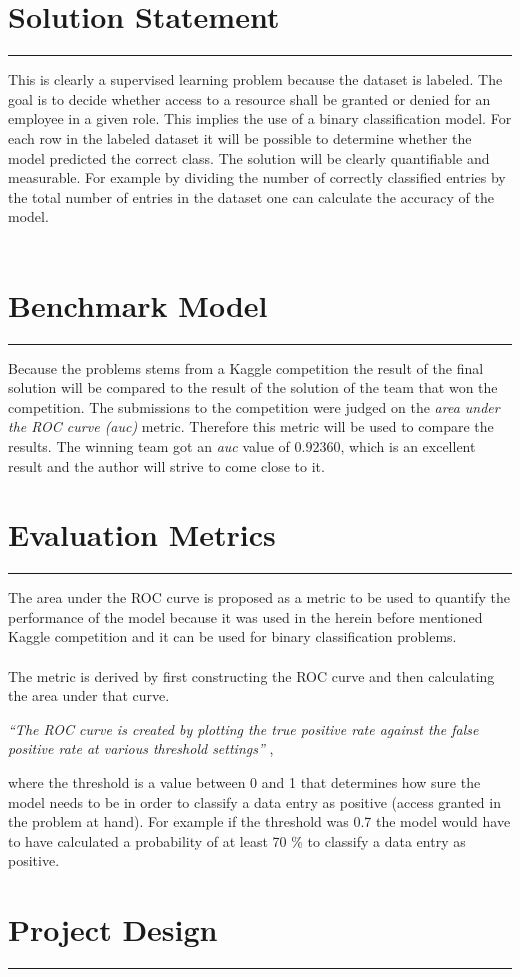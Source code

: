 \documentclass[11pt]{article}
\def\sectionheader#1{\section*{#1}\vskip -0.3cm\hrule\vskip 0.3cm}
\begin{document}
\sectionheader{Solution Statement}

This is clearly a supervised learning problem because the dataset is labeled.
The goal is to decide whether access to a resource shall be granted or denied for 
an employee in a given role. This implies the use of a binary classification model. 
For each row in the labeled dataset it will be possible to determine whether the model 
predicted the correct class. The solution will be clearly quantifiable and measurable. 
For example by dividing the number of correctly classified entries by the total number 
of entries in the dataset one can calculate the accuracy of the model.
\\ \\
\sectionheader{Benchmark Model}

Because the problems stems from a Kaggle competition the result of 
the final solution will be compared to the result of the solution of the team that won the competition. 
The submissions to the competition were judged on the {\it area under the ROC curve (auc)} metric. 
Therefore this metric will be used to compare the results. The winning team got an {\it auc} value 
of $0.92360$, which is an excellent result and the author will strive to come close to it.

\sectionheader{Evaluation Metrics}

The area under the ROC curve is proposed as a metric to be used to quantify the performance of 
the model because it was used in the herein before mentioned Kaggle competition and it can 
be used for binary classification problems. 
\\ \\
The metric is derived by first constructing the ROC curve and then calculating the area under 
that curve. 

{\it``The ROC curve is created by plotting the true positive rate against the false 
positive rate at various threshold settings''} \cite{rocCurve},
 
where the threshold is a value between 0 and 1 that determines how sure the model needs 
to be in order to classify a data entry as positive (access granted in the problem at hand). 
For example if the threshold was 0.7 the model would have to have calculated a probability 
of at least 70 $\%$ to classify a data entry as positive.

\sectionheader{Project Design}
\end{document}

